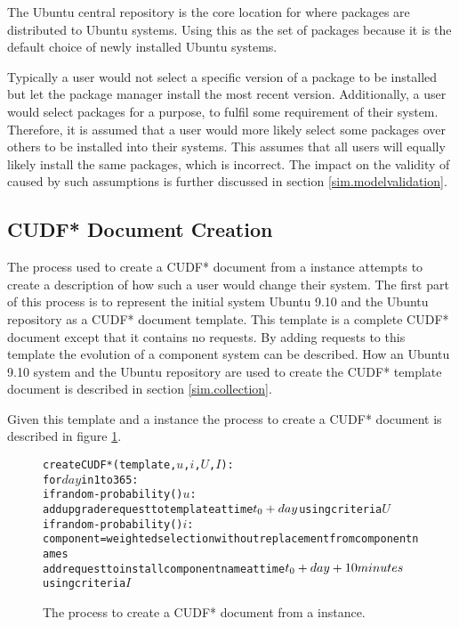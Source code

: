The Ubuntu central repository is the core location for where packages are distributed to Ubuntu systems.
Using this as the set of packages because it is the default choice of newly installed Ubuntu systems.

Typically a user would not select a specific version of a package to be installed but let the package manager install the most recent version.
Additionally, a user would select packages for a purpose, to fulfil some requirement of their system.
Therefore, it is assumed that a user would more likely select some packages over others to be installed into their systems.
This assumes that all users will equally likely install the same packages, which is incorrect.
The impact on the validity of \usermodel caused by such assumptions is further discussed in section \ref{sim.modelvalidation}.

\subsection{CUDF* Document Creation}
The process used to create a CUDF* document from a \usermodel instance attempts to create a description of how such a user would change their system.
The first part of this process is to represent the initial system Ubuntu 9.10 and the Ubuntu repository as a CUDF* document template.
This template is a complete CUDF* document except that it contains no requests.
By adding requests to this template the evolution of a component system can be described.
How an Ubuntu 9.10 system and the Ubuntu repository are used to create the CUDF* template document is described in section \ref{sim.collection}.

Given this template and a \usermodel instance the process to create a CUDF* document is described in figure \ref{sim.CUDF*}.
\begin{figure}[h]
\begin{center}
\begin{alltt}
createCUDF*(template, \( u\), \( i\), \( U\), \( I\)):
 for \(day\) in 1 to 365:
  if random-probability() \( u\):
    add upgrade request to template at time \(t\sb{0}+day\) using criteria \(U\)
  if random-probability() \( i\):  
   component = weighted selection without replacement from component names  
   add request to install component name at time \(t\sb{0}+day+10 minutes\) 
                                                      using criteria \(I\)
\end{alltt}
  \caption{The process to create a CUDF* document from a \usermodel instance.}
  \label{sim.CUDF*}
\end{center}
\end{figure}

